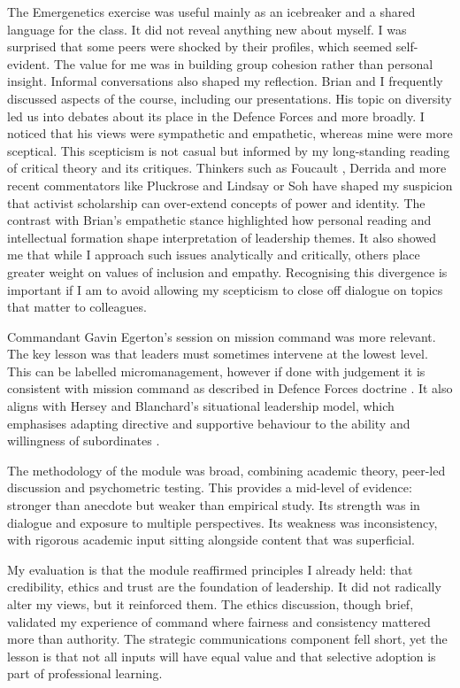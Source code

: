 The Emergenetics exercise was useful mainly as an icebreaker and a shared language for the class. It did not reveal anything new about myself. I was surprised that some peers were shocked by their profiles, which seemed self-evident. The value for me was in building group cohesion rather than personal insight. Informal conversations also shaped my reflection. Brian and I frequently discussed aspects of the course, including our presentations. His topic on diversity led us into debates about its place in the Defence Forces and more broadly. I noticed that his views were sympathetic and empathetic, whereas mine were more sceptical. This scepticism is not casual but informed by my long-standing reading of critical theory and its critiques. Thinkers such as Foucault \parencite{FOUCAULT_1977}, Derrida \parencite{DERRIDA_1978} and more recent commentators like Pluckrose and Lindsay \parencite{PLUCKROSE_2020} or Soh \parencite{SOH_2021} have shaped my suspicion that activist scholarship can over-extend concepts of power and identity. The contrast with Brian’s empathetic stance highlighted how personal reading and intellectual formation shape interpretation of leadership themes. It also showed me that while I approach such issues analytically and critically, others place greater weight on values of inclusion and empathy. Recognising this divergence is important if I am to avoid allowing my scepticism to close off dialogue on topics that matter to colleagues.


Commandant Gavin Egerton’s session on mission command was more relevant. The key lesson was that leaders must sometimes intervene at the lowest level. This can be labelled micromanagement, however if done with judgement it is consistent with mission command as described in Defence Forces doctrine \parencite{DF_LDR_2023}. It also aligns with Hersey and Blanchard’s situational leadership model, which emphasises adapting directive and supportive behaviour to the ability and willingness of subordinates \parencite{HERSEY_1969}.  

The methodology of the module was broad, combining academic theory, peer-led discussion and psychometric testing. This provides a mid-level of evidence: stronger than anecdote but weaker than empirical study. Its strength was in dialogue and exposure to multiple perspectives. Its weakness was inconsistency, with rigorous academic input sitting alongside content that was superficial.  

My evaluation is that the module reaffirmed principles I already held: that credibility, ethics and trust are the foundation of leadership. It did not radically alter my views, but it reinforced them. The ethics discussion, though brief, validated my experience of command where fairness and consistency mattered more than authority. The strategic communications component fell short, yet the lesson is that not all inputs will have equal value and that selective adoption is part of professional learning.  


